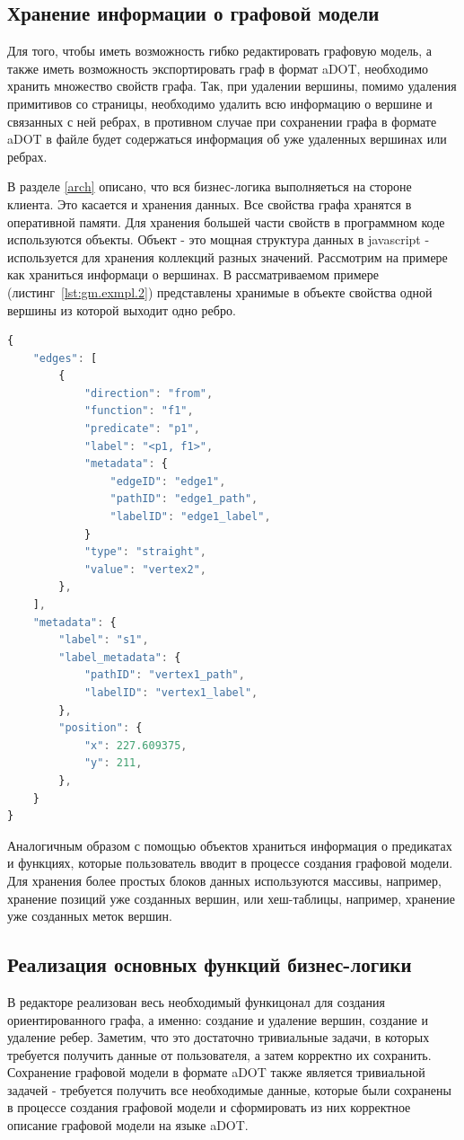 \subsection{Хранение информации о графовой модели}
Для того, чтобы иметь возможность гибко редактировать графовую модель, а также иметь возможность экспортировать граф в формат aDOT, необходимо хранить множество свойств графа. Так, при удалении вершины, помимо удаления примитивов со страницы, необходимо удалить всю информацию о вершине и связанных с ней ребрах, в противном случае при сохранении графа в формате aDOT в файле будет содержаться информация об уже удаленных вершинах или ребрах.

В разделе \ref{arch} описано, что вся бизнес-логика выполняеться на стороне клиента. Это касается и хранения данных. Все свойства графа хранятся в оперативной памяти. Для хранения большей части свойств в программном коде используются объекты. Объект - это мощная структура данных в javascript - используется для хранения коллекций разных значений. Рассмотрим на примере как храниться информаци о вершинах. В рассматриваемом примере (листинг~\ref{lst:gm.exmpl.2}) представлены хранимые в объекте свойства одной вершины из которой выходит одно ребро.

\begin{lstlisting}[label={lst:gm.exmpl.2}, caption={Пример хранение вершины в оперативной памяти}, language=JavaScript]
{
    "edges": [
        {
            "direction": "from",
            "function": "f1",
            "predicate": "p1",
            "label": "<p1, f1>",
            "metadata": {
                "edgeID": "edge1",
                "pathID": "edge1_path",
                "labelID": "edge1_label",
            }
            "type": "straight",
            "value": "vertex2",
        },
    ],
    "metadata": {
        "label": "s1",
        "label_metadata": {
            "pathID": "vertex1_path",
            "labelID": "vertex1_label",
        },
        "position": {
            "x": 227.609375,
            "y": 211,
        },
    }
}
\end{lstlisting}

Аналогичным образом с помощью объектов храниться информация о предикатах и функциях, которые пользователь вводит в процессе создания графовой модели. Для хранения более простых блоков данных используются массивы, например, хранение позиций уже созданных вершин, или хеш-таблицы, например, хранение уже созданных меток вершин.

\subsection{Реализация основных функций бизнес-логики}
В редакторе реализован весь необходимый функицонал для создания ориентированного графа, а именно: создание и удаление вершин, создание и удаление ребер. Заметим, что это достаточно тривиальные задачи, в которых требуется получить данные от пользователя, а затем корректно их сохранить. Сохранение графовой модели в формате aDOT также является тривиальной задачей - требуется получить все необходимые данные, которые были сохранены в процессе создания графовой модели и сформировать из них корректное описание графовой модели на языке aDOT.

